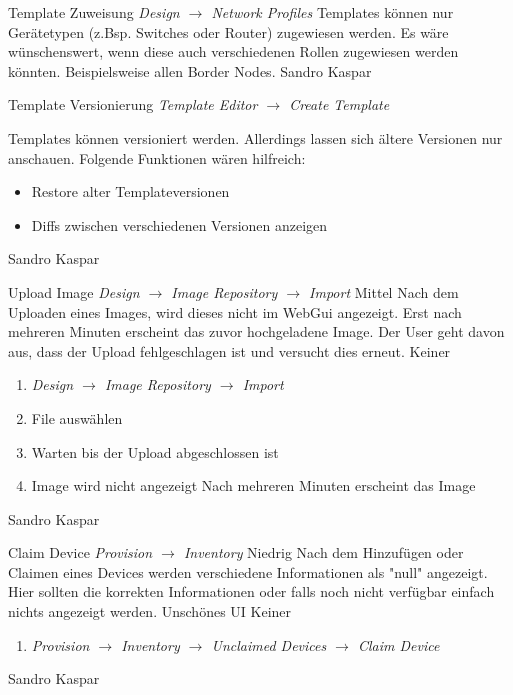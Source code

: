 \featureRequest
{Template Zuweisung}
{\textit{Design $\rightarrow$ Network Profiles}}
{Templates können nur Gerätetypen (z.Bsp. Switches oder Router) zugewiesen werden. Es wäre wünschenswert, wenn diese auch verschiedenen Rollen zugewiesen werden könnten. Beispielsweise allen Border Nodes.
}
{Sandro Kaspar}
{}

\featureRequest
{Template Versionierung}
{\textit{Template Editor $\rightarrow$ Create Template}}
{Templates können versioniert werden. Allerdings lassen sich ältere Versionen nur anschauen. Folgende Funktionen wären hilfreich:
\begin{itemize}
	\item Restore alter Templateversionen
	\item Diffs zwischen verschiedenen Versionen anzeigen
\end{itemize}
}
{Sandro Kaspar}
{}

\bugreport
{Upload Image}
{\textit{Design $\rightarrow$ Image Repository $\rightarrow$ Import}}
{Mittel}
{Nach dem Uploaden eines Images, wird dieses nicht im WebGui angezeigt. Erst nach mehreren Minuten erscheint das zuvor hochgeladene Image.
}
{Der User geht davon aus, dass der Upload fehlgeschlagen ist und versucht dies erneut.}
{Keiner}
{
	\begin{enumerate}
		\item \textit{Design $\rightarrow$ Image Repository $\rightarrow$ Import}
		\item File auswählen
		\item Warten bis der Upload abgeschlossen ist
		\item Image wird nicht angezeigt
		\subitem Nach mehreren Minuten erscheint das Image
	\end{enumerate}
}
{Sandro Kaspar}
{}


\bugreport
{Claim Device}
{\textit{Provision $\rightarrow$ Inventory}}
{Niedrig}
{Nach dem Hinzufügen oder Claimen eines Devices werden verschiedene Informationen als "null" angezeigt. Hier sollten die korrekten Informationen oder falls noch nicht verfügbar einfach nichts angezeigt werden.
}
{Unschönes UI}
{Keiner}
{
	\begin{enumerate}
		\item \textit{Provision $\rightarrow$ Inventory $\rightarrow$ Unclaimed Devices $\rightarrow$ Claim Device}
	\end{enumerate}
}
{Sandro Kaspar}
{}

